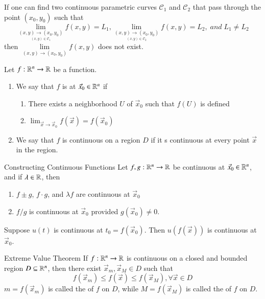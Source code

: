 \documentclass[12pt]{report}
\begin{document}
\begin{appendices}
    \begin{thm}{}{}
        If one can find two continuous parametric curves $\mathscr{C}_1$ and $\mathscr{C}_2$ that pass through the point $(x_0,y_0)$ such that \begin{equation}
            \lim\limits_{\underset{(x,y) \in \mathscr{C}_1}{(x,y)\rightarrow (x_0,y_0)}}f(x,y) = L_1, \lim\limits_{\underset{(x,y) \in \mathscr{C}_2}{(x,y)\rightarrow (x_0,y_0)}}f(x,y) = L_2,\;and\;L_1 \neq L_2
        \end{equation}
        then $\lim\limits_{(x,y)\rightarrow (x_0,y_0)}f(x,y)$ does not exist.
    \end{thm}

   
    \begin{defn}{}{}
        Let $f:\mathbb R^n\rightarrow \mathbb R$ be a function. \begin{enumerate}
            \item We say that $f$ is  at $\vec{x}_0 \in \mathbb R^n$ if \begin{enumerate}
                    \item There exists a neighborhood $U$ of $\vec{x}_0$ such that $f(U)$ is defined
                    \item $\lim_{\vec{x}\rightarrow \vec{x}_0}f(\vec{x}) = f(\vec{x}_0)$
            \end{enumerate}
            \item We say that $f$ is continuous on a region $D$ if it s continuous at every point $\vec{x}$ in the region.
        \end{enumerate}
    \end{defn}


    \begin{rmk}{Constructing Continuous Functions}{}
        Let $f,g:\mathbb R^n\rightarrow \mathbb R$ be continuous at $\vec{x}_0 \in \mathbb R^n$, and if $\lambda \in \mathbb R$, then \begin{enumerate}
            \item $f\pm g$, $f\cdot g$, and $\lambda f$ are continuous at $\vec{x}_0$
            \item $f/g$ is continuous at $\vec{x}_0$ provided $g(\vec{x}_0) \neq 0$.
        \end{enumerate}
        Suppose $u(t)$ is continuous at $t_0 = f(\vec{x}_0)$. Then $u(f(\vec{x}))$ is continuous at $\vec{x}_0$.
    \end{rmk}

    \begin{namthm}{Extreme Value Theorem}{}
        If $f:\mathbb R^n \rightarrow \mathbb R$ is continuous on a closed and bounded region $D \subseteq \mathbb R^n$, then there exist $\vec{x}_m,\vec{x}_M \in D$ such that \begin{equation}
            f(\vec{x}_m) \leq f(\vec{x}) \leq f(\vec{x}_M), \forall \vec{x} \in D
        \end{equation}
        $m = f(\vec{x}_m)$ is called the  of $f$ on $D$, while $M = f(\vec{x}_M)$ is called the  of $f$ on $D$.
    \end{namthm}
    


\end{appendices}
\end{document}
